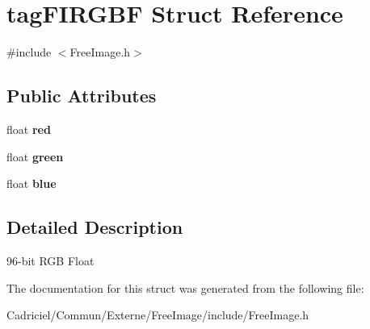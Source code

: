 \hypertarget{structtag_f_i_r_g_b_f}{\section{tag\-F\-I\-R\-G\-B\-F Struct Reference}
\label{structtag_f_i_r_g_b_f}
}


{\ttfamily \#include $<$Free\-Image.\-h$>$}

\subsection*{Public Attributes}
\begin{DoxyCompactItemize}
\item 
\hypertarget{structtag_f_i_r_g_b_f_ab15fa4a5afe84d7d66e598a1c1a17ffa}{float {\bfseries red}}\label{structtag_f_i_r_g_b_f_ab15fa4a5afe84d7d66e598a1c1a17ffa}

\item 
\hypertarget{structtag_f_i_r_g_b_f_ac062604601e6b4da84deb02a29287774}{float {\bfseries green}}\label{structtag_f_i_r_g_b_f_ac062604601e6b4da84deb02a29287774}

\item 
\hypertarget{structtag_f_i_r_g_b_f_a18cf7966f5a4f5ffd0820aa5a18f8362}{float {\bfseries blue}}\label{structtag_f_i_r_g_b_f_a18cf7966f5a4f5ffd0820aa5a18f8362}

\end{DoxyCompactItemize}


\subsection{Detailed Description}
96-\/bit R\-G\-B Float 

The documentation for this struct was generated from the following file\-:\begin{DoxyCompactItemize}
\item 
Cadriciel/\-Commun/\-Externe/\-Free\-Image/include/Free\-Image.\-h\end{DoxyCompactItemize}
